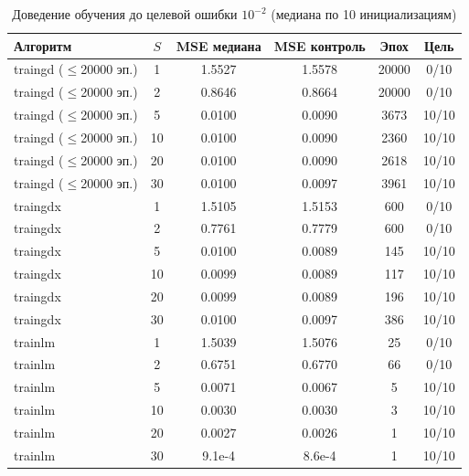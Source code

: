 \begin{table}[H]
\caption{Доведение обучения до целевой ошибки $10^{-2}$ (медиана по 10 инициализациям)}
\label{tab:algos}
\centering
\small
\begin{tabular}{lccccc}
\toprule
Алгоритм & $S$ & MSE медиана & MSE контроль & Эпох & Цель \\
\midrule
traingd ($\le$20000 эп.) & 1 & 1.5527 & 1.5578 & 20000 & 0/10 \\
traingd ($\le$20000 эп.) & 2 & 0.8646 & 0.8664 & 20000 & 0/10 \\
traingd ($\le$20000 эп.) & 5 & 0.0100 & 0.0090 & 3673 & 10/10 \\
traingd ($\le$20000 эп.) & 10 & 0.0100 & 0.0090 & 2360 & 10/10 \\
traingd ($\le$20000 эп.) & 20 & 0.0100 & 0.0090 & 2618 & 10/10 \\
traingd ($\le$20000 эп.) & 30 & 0.0100 & 0.0097 & 3961 & 10/10 \\
traingdx & 1 & 1.5105 & 1.5153 & 600 & 0/10 \\
traingdx & 2 & 0.7761 & 0.7779 & 600 & 0/10 \\
traingdx & 5 & 0.0100 & 0.0089 & 145 & 10/10 \\
traingdx & 10 & 0.0099 & 0.0089 & 117 & 10/10 \\
traingdx & 20 & 0.0099 & 0.0089 & 196 & 10/10 \\
traingdx & 30 & 0.0100 & 0.0097 & 386 & 10/10 \\
trainlm & 1 & 1.5039 & 1.5076 & 25 & 0/10 \\
trainlm & 2 & 0.6751 & 0.6770 & 66 & 0/10 \\
trainlm & 5 & 0.0071 & 0.0067 & 5 & 10/10 \\
trainlm & 10 & 0.0030 & 0.0030 & 3 & 10/10 \\
trainlm & 20 & 0.0027 & 0.0026 & 1 & 10/10 \\
trainlm & 30 & 9.1e-4 & 8.6e-4 & 1 & 10/10 \\
\bottomrule
\end{tabular}
\end{table}
